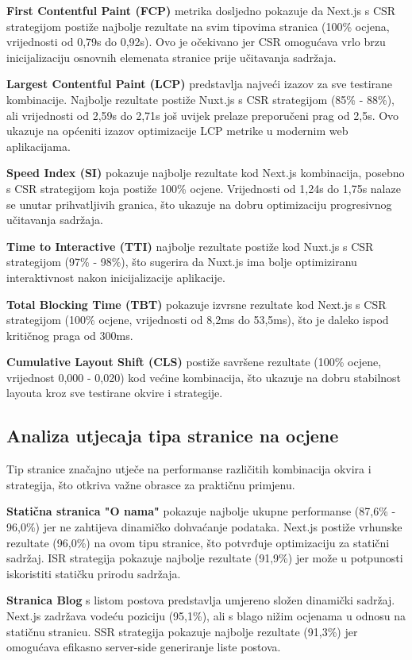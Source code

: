\textbf{First Contentful Paint (FCP)} metrika dosljedno pokazuje da Next.js s CSR strategijom postiže najbolje rezultate na svim tipovima stranica (100\% ocjena, vrijednosti od 0,79s do 0,92s). Ovo je očekivano jer CSR omogućava vrlo brzu inicijalizaciju osnovnih elemenata stranice prije učitavanja sadržaja.

\textbf{Largest Contentful Paint (LCP)} predstavlja najveći izazov za sve testirane kombinacije. Najbolje rezultate postiže Nuxt.js s CSR strategijom (85\% - 88\%), ali vrijednosti od 2,59s do 2,71s još uvijek prelaze preporučeni prag od 2,5s. Ovo ukazuje na općeniti izazov optimizacije LCP metrike u modernim web aplikacijama.

\textbf{Speed Index (SI)} pokazuje najbolje rezultate kod Next.js kombinacija, posebno s CSR strategijom koja postiže 100\% ocjene. Vrijednosti od 1,24s do 1,75s nalaze se unutar prihvatljivih granica, što ukazuje na dobru optimizaciju progresivnog učitavanja sadržaja.

\textbf{Time to Interactive (TTI)} najbolje rezultate postiže kod Nuxt.js s CSR strategijom (97\% - 98\%), što sugerira da Nuxt.js ima bolje optimiziranu interaktivnost nakon inicijalizacije aplikacije.

\textbf{Total Blocking Time (TBT)} pokazuje izvrsne rezultate kod Next.js s CSR strategijom (100\% ocjene, vrijednosti od 8,2ms do 53,5ms), što je daleko ispod kritičnog praga od 300ms.

\textbf{Cumulative Layout Shift (CLS)} postiže savršene rezultate (100\% ocjene, vrijednost 0,000 - 0,020) kod većine kombinacija, što ukazuje na dobru stabilnost layouta kroz sve testirane okvire i strategije.

\subsection{Analiza utjecaja tipa stranice na ocjene}

Tip stranice značajno utječe na performanse različitih kombinacija okvira i strategija, što otkriva važne obrasce za praktičnu primjenu.

\textbf{Statična stranica "O nama"} pokazuje najbolje ukupne performanse (87,6\% - 96,0\%) jer ne zahtijeva dinamičko dohvaćanje podataka. Next.js postiže vrhunske rezultate (96,0\%) na ovom tipu stranice, što potvrđuje optimizaciju za statični sadržaj. ISR strategija pokazuje najbolje rezultate (91,9\%) jer može u potpunosti iskoristiti statičku prirodu sadržaja.

\textbf{Stranica Blog} s listom postova predstavlja umjereno složen dinamički sadržaj. Next.js zadržava vodeću poziciju (95,1\%), ali s blago nižim ocjenama u odnosu na statičnu stranicu. SSR strategija pokazuje najbolje rezultate (91,3\%) jer omogućava efikasno server-side generiranje liste postova.

